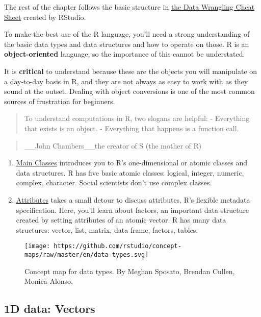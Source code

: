 \documentclass[
]{book}
\begin{document}
The rest of the chapter follows the basic structure in \href{https://rstudio.com/wp-content/uploads/2015/02/data-wrangling-cheatsheet.pdf}{the Data Wrangling Cheat Sheet} created by RStudio.

To make the best use of the R language, you'll need a strong understanding of the basic data types and data structures and how to operate on those. R is an \textbf{object-oriented} language, so the importance of this cannot be understated.

It is \textbf{critical} to understand because these are the objects you will manipulate on a day-to-day basis in R, and they are not always as easy to work with as they sound at the outset. Dealing with object conversions is one of the most common sources of frustration for beginners.

\begin{quote}
To understand computations in R, two slogans are helpful:
- Everything that exists is an object.
- Everything that happens is a function call.
\end{quote}

\begin{quote}
\_\_John Chambers\_\_the creator of S (the mother of R)
\end{quote}

\begin{enumerate}
\def\labelenumi{\arabic{enumi}.}
\item
  \protect\hyperlink{main-classes}{Main Classes} introduces you to R's one-dimensional or atomic classes and data structures. R has five basic atomic classes: logical, integer, numeric, complex, character. Social scientists don't use complex classes.
\item
  \protect\hyperlink{attributes}{Attributes} takes a small detour to discuss attributes, R's flexible metadata specification. Here, you'll learn about factors, an important data structure created by setting attributes of an atomic vector. R has many data structures: vector, list, matrix, data frame, factors, tables.
\end{enumerate}

\begin{figure}
\centering
\texttt{[image: https://github.com/rstudio/concept-maps/raw/master/en/data-types.svg]}
\caption{Concept map for data types. By Meghan Sposato, Brendan Cullen, Monica Alonso.}
\end{figure}

\hypertarget{d-data-vectors}{%
\subsection{1D data: Vectors}\label{d-data-vectors}}
\end{document}
